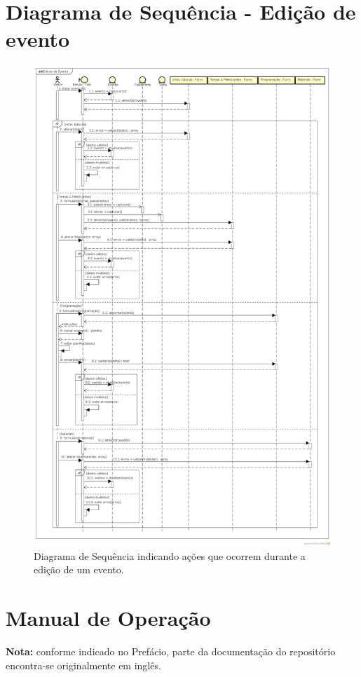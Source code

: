 \documentclass[12pt,a4paper,twoside,hyphens,english,brazil]{abntex2}
\begin{document}
{	\chapter{Diagrama de Sequência - Edição de evento} \label{apend:sd_event_edit}
	\begin{figure}[h!]
		\centering
		\includegraphics[width=0.7\linewidth]{diagramas/comuns/sd_event_edit.png}
		\caption{Diagrama de Sequência indicando ações que ocorrem durante a edição de um evento.}
		\label{diag:sd_event_edit}
	\end{figure}
	
\clearpage {} \recalctypearea

\chapter{Manual de Operação} \label{apend:operacao}

\begin{framed}
	\noindent
	\textbf{Nota:} conforme indicado no Prefácio, parte da documentação do repositório encontra-se originalmente em inglês.
\end{framed}

}
\end{document}
